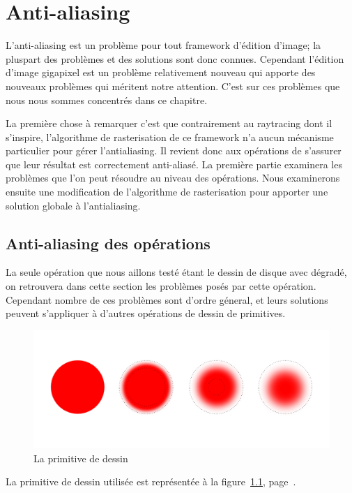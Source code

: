 \chapter{Anti-aliasing}
	L'anti-aliasing est un problème pour tout framework d'édition d'image; la pluspart
	des problèmes et des solutions sont donc connues. 
	Cependant l'édition d'image gigapixel est un problème relativement nouveau qui
	apporte des nouveaux problèmes qui méritent notre attention. C'est sur ces problèmes
	que nous nous sommes concentrés dans ce chapitre. 

	La première chose à remarquer c'est que contrairement au raytracing dont il s'inspire,
	l'algorithme de rasterisation de ce framework n'a aucun mécanisme
	particulier pour gérer l'antialiasing. Il revient donc aux opérations de s'assurer que
	leur résultat est correctement anti-aliasé. La première partie examinera les 
	problèmes que l'on peut résoudre au niveau des opérations. Nous examinerons ensuite 
	une modification de l'algorithme de rasterisation pour apporter une solution globale à
	l'antialiasing.

	\section{Anti-aliasing des opérations}

	La seule opération que nous aillons testé étant le dessin de disque avec 
	dégradé, on retrouvera dans cette section les problèmes posés par cette opération.
	Cependant nombre de ces problèmes sont d'ordre géneral, et leurs solutions peuvent
	s'appliquer à d'autres opérations de dessin de primitives. 

		\begin{figure}[ht]
			\centering
			\includegraphics[width=\textwidth]{images/brushes} 
			\caption{La primitive de dessin}
			\label{fig:brush}
		\end{figure}
	La primitive de dessin utilisée est représentée à la figure~\ref{fig:brush}, page~\pageref{fig:brush}.
	
